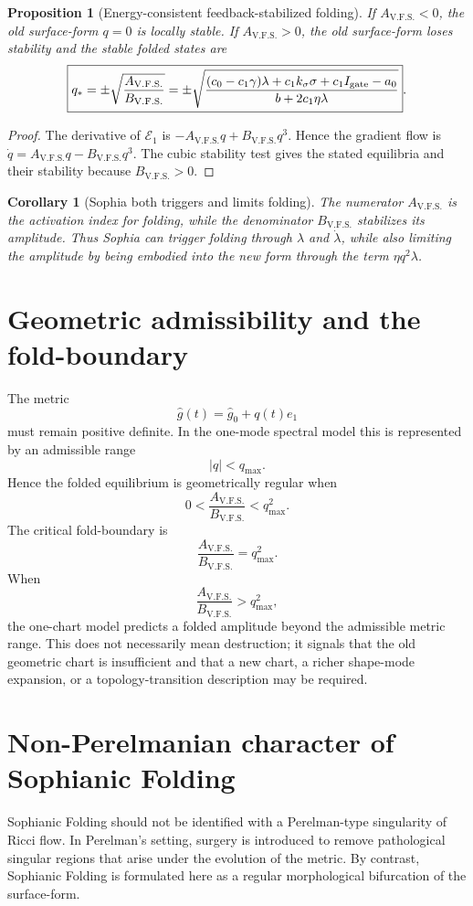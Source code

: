 \documentclass[11pt,a4paper]{article}
\newcommand{\VFS}{\ensuremath{\mathrm{V.F.S.}}}
\newcommand{\Igate}{I_{\rm gate}}
\theoremstyle{plain}
\newtheorem{proposition}{Proposition}
\newtheorem{corollary}{Corollary}
\theoremstyle{remark}
\theoremstyle{definition}
\begin{document}
\begin{proposition}[Energy-consistent feedback-stabilized folding]
If $A_{\VFS}<0$, the old surface-form $q=0$ is locally stable. If $A_{\VFS}>0$, the old
surface-form loses stability and the stable folded states are
\[
\boxed{
q_\ast=\pm\sqrt{\frac{A_{\VFS}}{B_{\VFS}}}
=
\pm
\sqrt{
\frac{(c_0-c_1\gamma)\lambda+c_1k_\sigma\sigma+c_1\Igate-a_0}
{b+2c_1\eta\lambda}}
}.
\]
\end{proposition}

\begin{proof}
The derivative of $\mathcal E_1$ is $-A_{\VFS}q+B_{\VFS}q^3$. Hence the gradient flow is
$\dot q=A_{\VFS}q-B_{\VFS}q^3$. The cubic stability test gives the stated equilibria and their
stability because $B_{\VFS}>0$.
\end{proof}

\begin{corollary}[Sophia both triggers and limits folding]
The numerator $A_{\VFS}$ is the activation index for folding, while the denominator $B_{\VFS}$
stabilizes its amplitude. Thus Sophia can trigger folding through $\lambda$ and $\dot\lambda$, while
also limiting the amplitude by being embodied into the new form through the term $\eta q^2\lambda$.
\end{corollary}

\section{Geometric admissibility and the fold-boundary}
The metric
\[
\widehat g(t)=\widehat g_0+q(t)e_1
\]
must remain positive definite. In the one-mode spectral model this is represented by an admissible range
\[
 |q|<q_{\max}.
\]
Hence the folded equilibrium is geometrically regular when
\[
\boxed{
0<\frac{A_{\VFS}}{B_{\VFS}}<q_{\max}^2.
}
\]
The critical fold-boundary is
\[
\boxed{
\frac{A_{\VFS}}{B_{\VFS}}=q_{\max}^2.
}
\]
When
\[
\boxed{
\frac{A_{\VFS}}{B_{\VFS}}>q_{\max}^2,
}
\]
the one-chart model predicts a folded amplitude beyond the admissible metric range. This does not
necessarily mean destruction; it signals that the old geometric chart is insufficient and that a new
chart, a richer shape-mode expansion, or a topology-transition description may be required.

\section{Non-Perelmanian character of Sophianic Folding}
Sophianic Folding should not be identified with a Perelman-type singularity of Ricci flow. In
Perelman's setting, surgery is introduced to remove pathological singular regions that arise under
the evolution of the metric. By contrast, Sophianic Folding is formulated here as a regular
morphological bifurcation of the surface-form.
\end{document}
